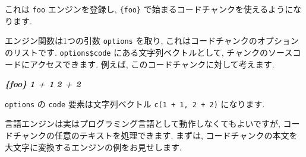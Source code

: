 \documentclass[
  11pt,
  lualatex,ja=standard,jafont=noto]{bxjsreport}
\newenvironment{Shaded}{\begin{snugshade}}{\end{snugshade}}
\newcommand{\AttributeTok}[1]{\textcolor[rgb]{0.77,0.63,0.00}{#1}}
\newcommand{\CommentTok}[1]{\textcolor[rgb]{0.56,0.35,0.01}{\textit{#1}}}
\newcommand{\ControlFlowTok}[1]{\textcolor[rgb]{0.13,0.29,0.53}{\textbf{#1}}}
\newcommand{\FunctionTok}[1]{\textcolor[rgb]{0.00,0.00,0.00}{#1}}
\newcommand{\InformationTok}[1]{\textcolor[rgb]{0.56,0.35,0.01}{\textbf{\textit{#1}}}}
\newcommand{\NormalTok}[1]{#1}
\newcommand{\OtherTok}[1]{\textcolor[rgb]{0.56,0.35,0.01}{#1}}
\newcommand{\SpecialCharTok}[1]{\textcolor[rgb]{0.00,0.00,0.00}{#1}}
\newcommand{\StringTok}[1]{\textcolor[rgb]{0.31,0.60,0.02}{#1}}
\begin{document}
\begin{Shaded}
\end{Shaded}

これは \texttt{foo} エンジンを登録し, \texttt{\textasciigrave{}\textasciigrave{}\textasciigrave{}\{foo\}} で始まるコードチャンクを使えるようになります.

エンジン関数は1つの引数 \texttt{options} を取り, これはコードチャンクのオプションのリストです. \texttt{options\$code} にある文字列ベクトルとして, チャンクのソースコードにアクセスできます. 例えば, このコードチャンクに対して考えます.

\begin{Shaded}
\begin{Highlighting}[]
\InformationTok{\textasciigrave{}\textasciigrave{}\textasciigrave{}\{foo\}}
\InformationTok{1 + 1}
\InformationTok{2 + 2}
\InformationTok{\textasciigrave{}\textasciigrave{}\textasciigrave{}}
\end{Highlighting}
\end{Shaded}

\texttt{options} の \texttt{code} 要素は文字列ベクトル \texttt{c(\textquotesingle{}1\ +\ 1\textquotesingle{},\ \textquotesingle{}2\ +\ 2\textquotesingle{})} になります.

言語エンジンは実はプログラミング言語として動作しなくてもよいですが, コードチャンクの任意のテキストを処理できます. まずは, コードチャンクの本文を大文字に変換するエンジンの例をお見せします.

\begin{Shaded}
\end{Shaded}
\end{document}
